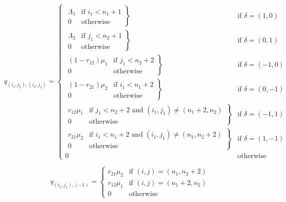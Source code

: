 \documentclass{article}
\numberwithin{equation}{section}
\begin{document}
\begin{equation}\label{eqn:2nsssA}
  q_{(i_1, j_1),(i_2, j_2)} = \left\{
  \begin{array}{rr}
    \left. \begin{array}{rr}
      \Lambda_1 & \text{if } i_1 < n_1 + 1 \\
      0 & \text{otherwise}
    \end{array} \right\} & \text{if } \delta = (1, 0) \\
    \left. \begin{array}{rr}
      \Lambda_2 & \text{if } j_1 < n_2 + 1 \\
      0 & \text{otherwise}
    \end{array} \right\} & \text{if } \delta = (0, 1) \\
    \left. \begin{array}{rr}
      (1 - r_{12})\mu_1 & \text{if } j_1 < n_2 + 2 \\
      0 & \text{otherwise}
    \end{array} \right\} & \text{if } \delta = (-1, 0) \\
    \left. \begin{array}{rr}
      (1 - r_{21})\mu_2 & \text{if } i_1 < n_1 + 2 \\
      0 & \text{otherwise}
    \end{array} \right\} & \text{if } \delta = (0, -1) \\
    \left. \begin{array}{rr}
      r_{12}\mu_1 & \text{if } j_1 < n_2 + 2 \text{ and } (i_1, j_1) \neq (n_1 + 2, n_2) \\
      0 & \text{otherwise}
    \end{array} \right\} & \text{if } \delta = (-1, 1) \\
    \left. \begin{array}{rr}
      r_{21}\mu_2 & \text{if } i_1 < n_1 + 2 \text{ and } (i_1, j_1) \neq (n_1, n_2 + 2) \\
      0 & \text{otherwise}
    \end{array} \right\} & \text{if } \delta = (1, -1) \\
    0 & \text{otherwise}
  \end{array} \right.
\end{equation}

\begin{equation}\label{eqn:2nsssB}
  q_{(i_1, j_1), (-1)} = \left\{
  \begin{array}{rr}
    r_{21}\mu_2 & \text{if } (i, j) = (n_1, n_2 + 2) \\
    r_{12}\mu_1 & \text{if } (i, j) = (n_1 + 2, n_2) \\
    0 & \text{otherwise}
  \end{array}
  \right.
\end{equation}
\end{document}
